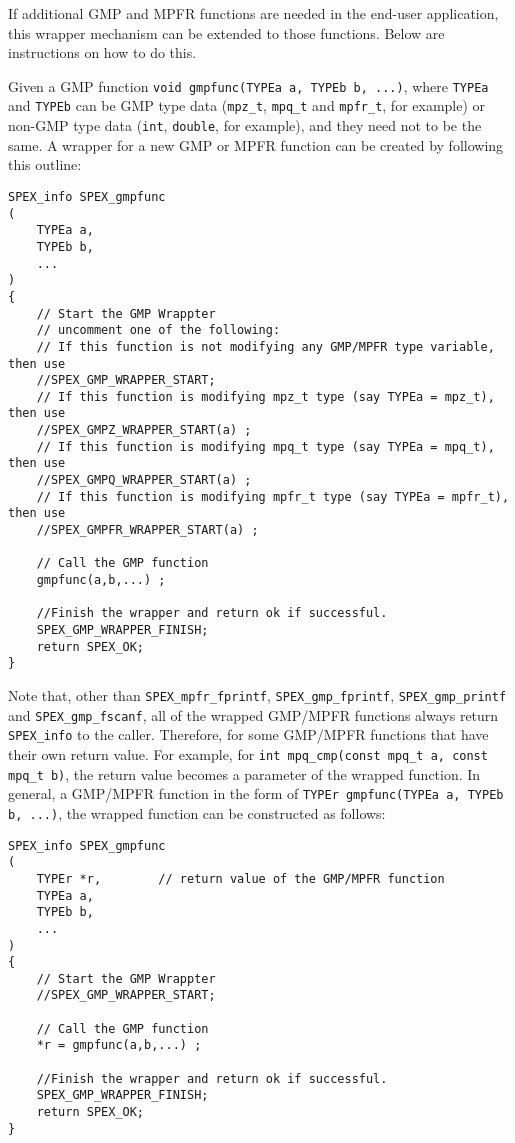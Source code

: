 \documentclass[12pt]{report}
\theoremstyle{definition}
\begin{document}
If additional GMP and MPFR functions are needed in the end-user application,
this wrapper mechanism can be extended to those functions.  Below are
instructions on how to do this.

Given a GMP function \verb|void gmpfunc(TYPEa a, TYPEb b, ...)|, where
\verb|TYPEa| and \verb|TYPEb| can be GMP type data (\verb|mpz_t|,
\verb|mpq_t| and \verb|mpfr_t|, for example) or non-GMP type data (\verb|int|,
\verb|double|, for example), and they need not to be the same.
A wrapper for a new GMP or MPFR function can be created by following
this outline:

\begin{mdframed}[userdefinedwidth=6in]
{\footnotesize
\begin{verbatim}
SPEX_info SPEX_gmpfunc
(
    TYPEa a,
    TYPEb b,
    ...
)
{
    // Start the GMP Wrappter
    // uncomment one of the following:
    // If this function is not modifying any GMP/MPFR type variable, then use
    //SPEX_GMP_WRAPPER_START;
    // If this function is modifying mpz_t type (say TYPEa = mpz_t), then use
    //SPEX_GMPZ_WRAPPER_START(a) ;
    // If this function is modifying mpq_t type (say TYPEa = mpq_t), then use
    //SPEX_GMPQ_WRAPPER_START(a) ;
    // If this function is modifying mpfr_t type (say TYPEa = mpfr_t), then use
    //SPEX_GMPFR_WRAPPER_START(a) ;

    // Call the GMP function
    gmpfunc(a,b,...) ;

    //Finish the wrapper and return ok if successful.
    SPEX_GMP_WRAPPER_FINISH;
    return SPEX_OK;
}
\end{verbatim}
} \end{mdframed}

Note that, other than \verb|SPEX_mpfr_fprintf|, \verb|SPEX_gmp_fprintf|,
\verb|SPEX_gmp_printf| and \verb|SPEX_gmp_fscanf|, all of the wrapped GMP/MPFR
functions always return \verb|SPEX_info| to the caller. Therefore, for some
GMP/MPFR functions that have their own return value.  For example, for
\verb|int mpq_cmp(const mpq_t a, const mpq_t b)|, the return value becomes a
parameter of the wrapped function. In general, a GMP/MPFR function in the form
of \verb|TYPEr gmpfunc(TYPEa a, TYPEb b, ...)|, the wrapped
function can be constructed as follows:

\begin{mdframed}[userdefinedwidth=6in]
{\footnotesize
\begin{verbatim}
SPEX_info SPEX_gmpfunc
(
    TYPEr *r,        // return value of the GMP/MPFR function
    TYPEa a,
    TYPEb b,
    ...
)
{
    // Start the GMP Wrappter
    //SPEX_GMP_WRAPPER_START;

    // Call the GMP function
    *r = gmpfunc(a,b,...) ;

    //Finish the wrapper and return ok if successful.
    SPEX_GMP_WRAPPER_FINISH;
    return SPEX_OK;
}
\end{verbatim}
} \end{mdframed}
\end{document}
